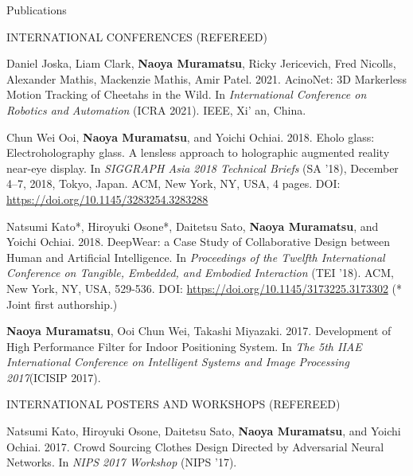 \documentclass{resume} %
\begin{document}
\begin{rSection}{Publications} \itemsep 4pt



    \begin{rSubsection}{INTERNATIONAL CONFERENCES (REFEREED)}{}{}{}{}
        \item Daniel Joska, Liam Clark, \textbf{Naoya Muramatsu}, Ricky Jericevich, Fred Nicolls, Alexander Mathis, Mackenzie Mathis, Amir Patel. 2021. AcinoNet: 3D Markerless Motion Tracking of Cheetahs in the Wild. In \textit{International Conference on Robotics and Automation} (ICRA 2021). IEEE, Xi' an, China.

        \item Chun Wei Ooi, \textbf{Naoya Muramatsu}, and Yoichi Ochiai. 2018. Eholo glass: Electroholography glass. A lensless approach to holographic augmented reality near-eye display. In \textit{SIGGRAPH Asia 2018 Technical Briefs} (SA ’18), December 4–7, 2018, Tokyo, Japan. ACM, New York, NY, USA, 4 pages. DOI: \url{https://doi.org/10.1145/3283254.3283288}

        \item Natsumi Kato*, Hiroyuki Osone*, Daitetsu Sato, \textbf{Naoya Muramatsu}, and Yoichi Ochiai. 2018. DeepWear: a Case Study of Collaborative Design between Human and Artificial Intelligence. In \textit{Proceedings of the Twelfth International Conference on Tangible, Embedded, and Embodied Interaction} (TEI ’18). ACM, New York, NY, USA, 529-536. DOI: \url{https://doi.org/10.1145/3173225.3173302} (* Joint first authorship.)

        \item \textbf{Naoya Muramatsu}, Ooi Chun Wei, Takashi Miyazaki. 2017. Development of High Performance Filter for Indoor Positioning System. In \textit{The 5th IIAE International Conference on Intelligent Systems and Image Processing 2017}(ICISIP 2017).
    \end{rSubsection}

    \begin{rSubsection}{INTERNATIONAL POSTERS AND WORKSHOPS (REFEREED)}{}{}{}{}
        \item Natsumi Kato, Hiroyuki Osone, Daitetsu Sato, \textbf{Naoya Muramatsu}, and Yoichi Ochiai. 2017. Crowd Sourcing Clothes Design Directed by Adversarial Neural Networks. In \textit{NIPS 2017 Workshop} (NIPS ’17).


\end{rSubsection}
\end{rSection}
\end{document}
